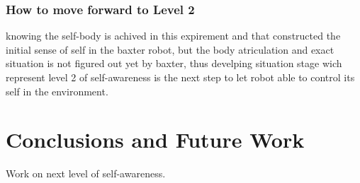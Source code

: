 \documentclass[12pt]{article}
\begin{document}
\subsubsection{How to move forward to Level 2}
knowing the self-body is achived in this expirement and that constructed the initial sense of self in the baxter robot, but the body atriculation and exact situation is not figured out yet by baxter, thus develping situation stage wich represent level 2 of self-awareness is the next step to let robot able to control its self in the environment.

\section{Conclusions and Future Work}
Work on next level of self-awareness.
\end{document}
